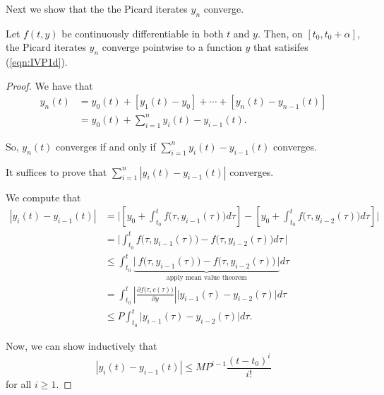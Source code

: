 \documentclass{article}
\begin{document}
Next we show that the the Picard iterates $y_n$ converge.

\begin{theorem}
    Let $f(t,y)$ be continuously differentiable in both $t$ and $y$.
    Then, on $[t_0, t_0 + \alpha]$, the Picard iterates $y_n$ converge pointwise to a function $y$ that satisifes (\ref{eqn:IVP1d}).
\end{theorem}

\begin{proof}

We have that
\begin{align*}
    y_n(t)
    &=
    y_0(t) + [y_1(t)-y_0] + \cdots + [y_n(t)-y_{n-1}(t)] \\
    &=
    y_0(t)
    +
    \sum_{i=1}^n
    y_i(t)-y_{i-1}(t).
\end{align*}

So, $y_n(t)$ converges if and only if $\sum_{i=1}^n y_i(t)-y_{i-1}(t)$ converges.

It suffices to prove that $\sum_{i=1}^n |y_i(t) - y_{i-1}(t)|$ converges.

We compute that
\begin{align*}
    |y_i(t) - y_{i-1}(t)|
    &=
    \Bigg|
        \left[
            y_0 
            + \int_{t_0}^t
            f\big(\tau,y_{i-1}(\tau)\big)
            d\tau
        \right]
        -
        \left[
            y_0
            + \int_{t_0}^t
            f\big(\tau,y_{i-2}(\tau)\big)
            d\tau
        \right]
    \Bigg| \\
    &=
    \Bigg\lvert
    \int_{t_0}^t
    f\big(\tau,y_{i-1}(\tau)\big)
    - f\big(\tau,y_{i-2}(\tau)\big)
    d\tau\:
    \Bigg\rvert \\
    &\leq
    \int_{t_0}^t
    \underbrace{
        \big\lvert\:
            f\big(\tau,y_{i-1}(\tau)\big)
            - f\big(\tau,y_{i-2}(\tau)\big)
        \,\big\rvert
    }_{\text{apply mean value theorem}}
    d\tau \\
    &=
    \int_{t_0}^t
    \left\lvert
        \frac{\partial f\big(\tau, c(\tau)\big)}
        {\partial y}
    \right\rvert
    \big\lvert
        y_{i-1}(\tau) - y_{i-2}(\tau)
    \big\rvert
    d\tau \\
    &\leq
    P
    \int_{t_0}^t
    \big\lvert
        y_{i-1}(\tau) - y_{i-2}(\tau)
    \big\rvert
    d\tau.
\end{align*}

Now, we can show inductively that 
\begin{equation}
    \label{eqn:PicardIterErrorBound}
    |y_i(t)-y_{i-1}(t)|
    \leq
    MP^{i-1}\frac{(t-t_0)^i}{i!}
\end{equation}
for all $i \geq 1$.


\end{proof}
\end{document}
